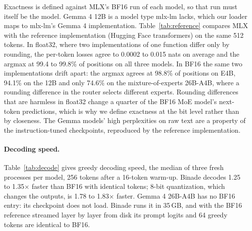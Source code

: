 \documentclass[11pt]{article}
\newcommand{\x}{$\times$}
\begin{document}
Exactness is defined against MLX's BF16 run of each model, so that run must itself be the model. Gemma 4 12B is a model type mlx-lm lacks, which our loader maps to mlx-lm's Gemma 4 implementation. Table~\ref{tab:reference} compares MLX with the reference implementation (Hugging Face transformers) on the same 512 tokens. In float32, where two implementations of one function differ only by rounding, the per-token losses agree to 0.0002 to 0.015 nats on average and the argmax at 99.4 to 99.8\% of positions on all three models. In BF16 the same two implementations drift apart: the argmax agrees at 98.8\% of positions on E4B, 94.1\% on the 12B and only 74.6\% on the mixture-of-experts 26B-A4B, where a rounding difference in the router selects different experts. Rounding differences that are harmless in float32 change a quarter of the BF16 MoE model's next-token predictions, which is why we define exactness at the bit level rather than by closeness. The Gemma models' high perplexities on raw text are a property of the instruction-tuned checkpoints, reproduced by the reference implementation.

\begin{table}[t]
\centering
\caption{MLX against the reference implementation on 512 WikiText-2 tokens, both sides on the same device (the 26B in float32 does not fit the GPU and ran on the CPU): perplexity, argmax agreement and per-token loss difference in nats.}
\label{tab:reference}

\end{table}

\paragraph{Decoding speed.} Table~\ref{tab:decode} gives greedy decoding speed, the median of three fresh processes per model, 256 tokens after a 16-token warm-up. Binade decodes 1.25 to 1.35\x{} faster than BF16 with identical tokens; 8-bit quantization, which changes the outputs, is 1.78 to 1.83\x{} faster. Gemma 4 26B-A4B has no BF16 entry: its checkpoint does not load. Binade runs it in 35\,GB, and with the BF16 reference streamed layer by layer from disk its prompt logits and 64 greedy tokens are identical to BF16.

\begin{table}[t]
\centering
\caption{Greedy decoding, tokens per second (median of three fresh processes).}
\label{tab:decode}

\end{table}
\end{document}
